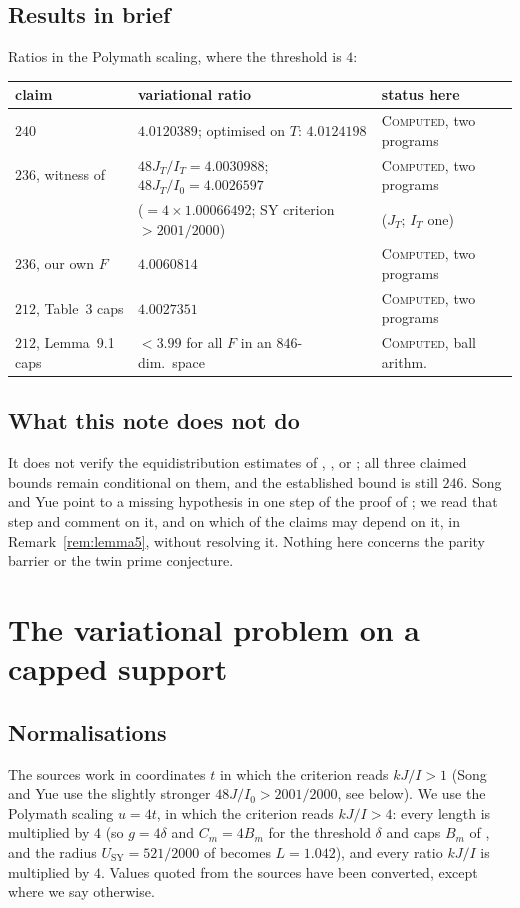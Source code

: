 \documentclass[11pt]{amsart}
\theoremstyle{definition}
\theoremstyle{remark}
\newcommand{\lbl}[1]{\textup{\textsc{#1}}}
\begin{document}
\subsection*{Results in brief}
Ratios in the Polymath scaling, where the threshold is $4$:
\begin{center}\small
\begin{tabular}{@{}lll@{}}
\toprule
claim & variational ratio & status here\\
\midrule
$240$ & $4.0120389$; optimised on $T$: $4.0124198$ & \lbl{Computed}, two programs\\
$236$, witness of \cite{SY26} & $48J_T/I_T=4.0030988$; $48J_T/I_0=4.0026597$ & \lbl{Computed}, two programs\\
 & \quad($=4\times1.00066492$; SY criterion $>2001/2000$) & ($J_T$; $I_T$ one)\\
$236$, our own $F$ & $4.0060814$ & \lbl{Computed}, two programs\\
$212$, Table~3 caps & $4.0027351$ & \lbl{Computed}, two programs\\
$212$, Lemma~9.1 caps & $<3.99$ for all $F$ in an $846$-dim.\ space & \lbl{Computed}, ball arithm.\\
\bottomrule
\end{tabular}
\end{center}

\subsection*{What this note does not do}
It does not verify the equidistribution estimates of \cite{Sta26},
\cite{Kin26}, \cite{SY26} or \cite{Cha26}; all three claimed bounds remain conditional
on them, and the established bound is still $246$. Song and Yue
\cite[Remark~4.23]{SY26} point to a missing hypothesis in one step of the
proof of \cite[Lemma~5]{Sta26}; we read that step and comment on it, and on
which of the claims may depend on it, in Remark~\ref{rem:lemma5}, without
resolving it. Nothing here concerns the
parity barrier or the twin prime conjecture.

\section{The variational problem on a capped support}

\subsection*{Normalisations}
The sources work in coordinates $t$ in which the criterion reads $kJ/I>1$
(Song and Yue use the slightly stronger $48J/I_0>2001/2000$, see below). We
use the Polymath scaling $u=4t$, in which the criterion reads $kJ/I>4$: every
length is multiplied by $4$ (so $g=4\delta$ and $C_m=4B_m$ for the threshold
$\delta$ and caps $B_m$ of \cite{Sta26}, and the radius $U_{\mathrm{SY}}=521/2000$
of \cite{SY26} becomes $L=1.042$), and every ratio $kJ/I$ is multiplied by
$4$. Values quoted from the sources have been converted, except where we say
otherwise.
\end{document}
